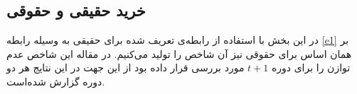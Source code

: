 \documentclass[12pt]{article}
\begin{document}
\subsection{خرید حقیقی و حقوقی}
در این بخش با استفاده از رابطه‌ی تعریف شده برای حقیقی به وسیله رابطه 
\ref{e1}
بر همان اساس برای حقوقی نیز آن شاخص را تولید می‌کنیم. در مقاله این شاخص عدم توازن را برای دوره $ t+1 $ مورد بررسی قرار داده بود از این جهت در این نتایج هر دو دوره گزارش شده‌است.
\begin{LTR}
\end{LTR}
\end{document}

